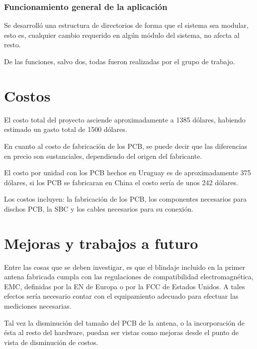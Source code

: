 \documentclass[%
        final,
        notitlepage,
        narroweqnarray,
        inline,
        ]{ieee}
\begin{document}
\bigskip
\subsubsection*{Funcionamiento general de la aplicación}

Se desarrolló una estructura de directorios de forma que el sistema sea modular, esto es, cualquier cambio requerido en algún módulo del sistema, no afecta al resto.

De las funciones, salvo dos, todas fueron realizadas por el grupo de trabajo. \pagebreak 


\section{Costos}

El costo total del proyecto asciende aproximadamente a 1385 dólares, habiendo 
estimado un gasto total de 1500 dólares.

En cuanto al costo de fabricación de los PCB, se puede decir
que las diferencias en precio son sustanciales, dependiendo
del origen del fabricante. 

El costo por unidad con los PCB hechos en Uruguay es de aproximadamente 375 dólares, si los PCB se fabricaran en China el costo sería de unos 242 dólares.

Los costos incluyen: la fabricación de los PCB, los componentes necesarios para dischos PCB, la SBC y los cables necesarios para su conexión.

\section{Mejoras y trabajos a futuro}

Entre las cosas que se deben investigar, es que el blindaje incluido 
en la primer antena fabricada cumpla con las regulaciones de compatibilidad 
electromagnética, EMC, definidas por la EN de Europa o por la FCC de Estados 
Unidos. A tales efectos sería necesario contar con el equipamiento adecuado
para efectuar las mediciones necesarias.

Tal vez la disminución del tamaño del PCB de la antena, o la incorporación
de ésta al resto del hardware, puedan ser vistas como mejoras desde el 
punto de vista de disminución de costos.
\end{document}
